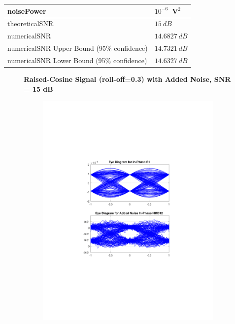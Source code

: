 \begin{refsection}
\begin{table}[H]
\begin{tabular}{|l|l|}
		noisePower   & $10^{-6}$~V$^2$                             					\\ \hline
		theoreticalSNR  	   & $15~dB$                             					\\ \hline
				numericalSNR 		     & $14.6827~dB$                             					\\ \hline
		numericalSNR Upper Bound (95\% confidence) & $14.7321~dB$                             					\\ \hline
		numericalSNR Lower Bound (95\% confidence) & $14.6327~dB$                             					\\ \hline
	\end{tabular}
\end{table}
\begin{figure}[H]
		\centering
	\textbf{Raised-Cosine Signal (roll-off=0.3) with Added Noise, SNR = 15 dB}
	\begin{minipage}{\linewidth}
		\centering
	\begin{subfigure}{.45\textwidth}
		\centering
		\includegraphics[clip, trim=5cm 7cm 5cm 7cm, width=\textwidth]{./sdf/m_qam_system/figures/eyes/if_n_nmf_45_60_rc.pdf}

\end{subfigure}
\end{minipage}
\end{figure}
\end{refsection}
